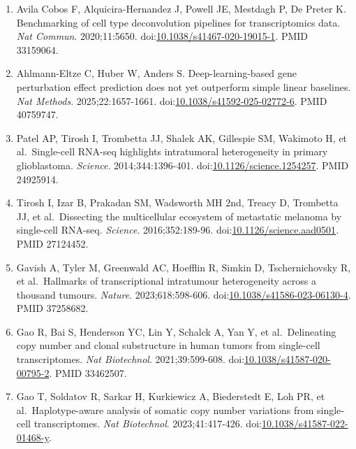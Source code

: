 \documentclass{article}
\begin{document}
\begin{enumerate}
  and single-cell transcriptomics integration methods for transcript
  distribution prediction and cell type deconvolution. \emph{Nat
  Methods}. 2022;19:662-670.
  doi:\href{https://doi.org/10.1038/s41592-022-01480-9}{10.1038/s41592-022-01480-9}.
  PMID 35577954.
\item
  Avila Cobos F, Alquicira-Hernandez J, Powell JE, Mestdagh P, De Preter
  K. Benchmarking of cell type deconvolution pipelines for
  transcriptomics data. \emph{Nat Commun}. 2020;11:5650.
  doi:\href{https://doi.org/10.1038/s41467-020-19015-1}{10.1038/s41467-020-19015-1}.
  PMID 33159064.
\item
  Ahlmann-Eltze C, Huber W, Anders S. Deep-learning-based gene
  perturbation effect prediction does not yet outperform simple linear
  baselines. \emph{Nat Methods}. 2025;22:1657-1661.
  doi:\href{https://doi.org/10.1038/s41592-025-02772-6}{10.1038/s41592-025-02772-6}.
  PMID 40759747.
\item
  Patel AP, Tirosh I, Trombetta JJ, Shalek AK, Gillespie SM, Wakimoto H,
  et al.~Single-cell RNA-seq highlights intratumoral heterogeneity in
  primary glioblastoma. \emph{Science}. 2014;344:1396-401.
  doi:\href{https://doi.org/10.1126/science.1254257}{10.1126/science.1254257}.
  PMID 24925914.
\item
  Tirosh I, Izar B, Prakadan SM, Wadsworth MH 2nd, Treacy D, Trombetta
  JJ, et al.~Dissecting the multicellular ecosystem of metastatic
  melanoma by single-cell RNA-seq. \emph{Science}. 2016;352:189-96.
  doi:\href{https://doi.org/10.1126/science.aad0501}{10.1126/science.aad0501}.
  PMID 27124452.
\item
  Gavish A, Tyler M, Greenwald AC, Hoefflin R, Simkin D, Tschernichovsky
  R, et al.~Hallmarks of transcriptional intratumour heterogeneity
  across a thousand tumours. \emph{Nature}. 2023;618:598-606.
  doi:\href{https://doi.org/10.1038/s41586-023-06130-4}{10.1038/s41586-023-06130-4}.
  PMID 37258682.
\item
  Gao R, Bai S, Henderson YC, Lin Y, Schalck A, Yan Y, et
  al.~Delineating copy number and clonal substructure in human tumors
  from single-cell transcriptomes. \emph{Nat Biotechnol}.
  2021;39:599-608.
  doi:\href{https://doi.org/10.1038/s41587-020-00795-2}{10.1038/s41587-020-00795-2}.
  PMID 33462507.
\item
  Gao T, Soldatov R, Sarkar H, Kurkiewicz A, Biederstedt E, Loh PR, et
  al.~Haplotype-aware analysis of somatic copy number variations from
  single-cell transcriptomes. \emph{Nat Biotechnol}. 2023;41:417-426.
  doi:\href{https://doi.org/10.1038/s41587-022-01468-y}{10.1038/s41587-022-01468-y}.

\end{enumerate}
\end{document}
